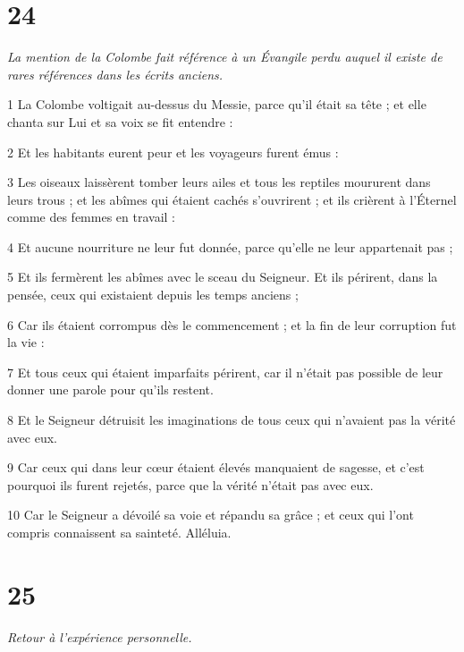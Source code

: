 \chapter{24}

\par \textit{La mention de la Colombe fait référence à un Évangile perdu auquel il existe de rares références dans les écrits anciens.}

\par 1 La Colombe voltigait au-dessus du Messie, parce qu'il était sa tête ; et elle chanta sur Lui et sa voix se fit entendre :
\par 2 Et les habitants eurent peur et les voyageurs furent émus :
\par 3 Les oiseaux laissèrent tomber leurs ailes et tous les reptiles moururent dans leurs trous ; et les abîmes qui étaient cachés s'ouvrirent ; et ils crièrent à l'Éternel comme des femmes en travail :
\par 4 Et aucune nourriture ne leur fut donnée, parce qu'elle ne leur appartenait pas ;
\par 5 Et ils fermèrent les abîmes avec le sceau du Seigneur. Et ils périrent, dans la pensée, ceux qui existaient depuis les temps anciens ;
\par 6 Car ils étaient corrompus dès le commencement ; et la fin de leur corruption fut la vie :
\par 7 Et tous ceux qui étaient imparfaits périrent, car il n'était pas possible de leur donner une parole pour qu'ils restent.
\par 8 Et le Seigneur détruisit les imaginations de tous ceux qui n'avaient pas la vérité avec eux.
\par 9 Car ceux qui dans leur cœur étaient élevés manquaient de sagesse, et c'est pourquoi ils furent rejetés, parce que la vérité n'était pas avec eux.
\par 10 Car le Seigneur a dévoilé sa voie et répandu sa grâce ; et ceux qui l'ont compris connaissent sa sainteté. Alléluia.

\chapter{25}

\par \textit{Retour à l'expérience personnelle.}

